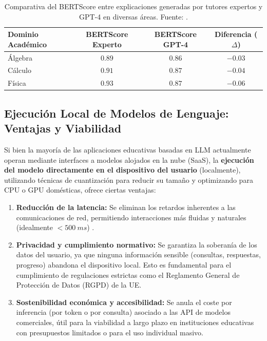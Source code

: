 \begin{table}[H]
\centering
\begin{tabular}{lccc}
\toprule
\textbf{Dominio Académico} & \textbf{BERTScore Experto} & \textbf{BERTScore GPT-4} & \textbf{Diferencia (\(\Delta\))}\\
\midrule
Álgebra  & \(0.89\) & \(0.86\) & \(-0.03\)\\
Cálculo  & \(0.91\) & \(0.87\) & \(-0.04\)\\
Física   & \(0.93\) & \(0.87\) & \(-0.06\)\\
\bottomrule
\end{tabular}
\caption{Comparativa del BERTScore entre explicaciones generadas por tutores expertos y GPT-4 en diversas áreas. Fuente: \cite{Dempere2023}.}
\label{tab:gpt-vs-expert}
\end{table}

\subsection{Ejecución Local de Modelos de Lenguaje: Ventajas y Viabilidad}
\label{ssec:ejecucion_local_llm}

Si bien la mayoría de las aplicaciones educativas basadas en LLM actualmente operan mediante interfaces a modelos alojados en la nube (SaaS), la \textbf{ejecución del modelo directamente en el dispositivo del usuario} (localmente), utilizando técnicas de cuantización para reducir su tamaño y optimizando para CPU o GPU domésticas, ofrece ciertas ventajas:

\begin{enumerate}[label=\alph*),leftmargin=*]
  \item \textbf{Reducción de la latencia:} Se eliminan los retardos inherentes a las comunicaciones de red, permitiendo interacciones más fluidas y naturales (idealmente \(<\SI{500}{ms}\)) \cite{Kramer2024}.
  \item \textbf{Privacidad y cumplimiento normativo:} Se garantiza la soberanía de los datos del usuario, ya que ninguna información sensible (consultas, respuestas, progreso) abandona el dispositivo local. Esto es fundamental para el cumplimiento de regulaciones estrictas como el Reglamento General de Protección de Datos (RGPD) de la UE.
  \item \textbf{Sostenibilidad económica y accesibilidad:} Se anula el coste por inferencia (por token o por consulta) asociado a las API de modelos comerciales, útil para la viabilidad a largo plazo en instituciones educativas con presupuestos limitados o para el uso individual masivo.
\end{enumerate}

